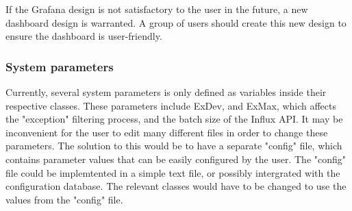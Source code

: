 \documentclass[main.tex]{subfiles}
\begin{document}
If the Grafana design is not satisfactory to the user in the future, a new dashboard design is warranted. A group of users should create this new design to ensure the dashboard is user-friendly.

\subsubsection{System parameters}

Currently, several system parameters is only defined as variables inside their respective classes. These parameters include ExDev, and ExMax, which affects the "exception" filtering process, and the batch size of the Influx API. It may be inconvenient for the user to edit many different files in order to change these parameters. The solution to this would be to have a separate "config" file, which contains parameter values that can be easily configured by the user. The "config" file could be implemtented in a simple text file, or possibly intergrated with the configuration database. The relevant classes would have to be changed to use the values from the "config" file.


 
\end{document}
